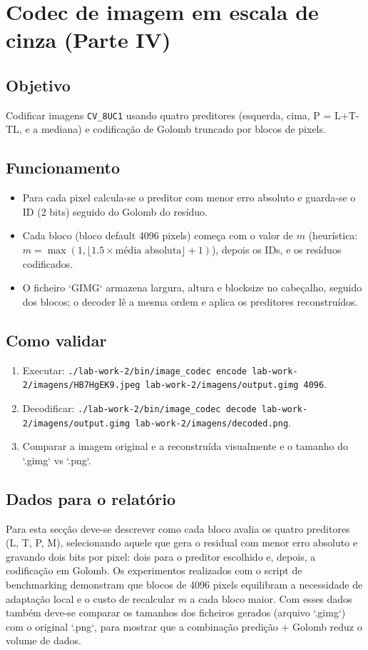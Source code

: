 \FloatBarrier

\section{Codec de imagem em escala de cinza (Parte IV)}
\subsection{Objetivo}
Codificar imagens \texttt{CV\_8UC1} usando quatro preditores (esquerda, cima, P = L+T-TL, e a mediana) e codificação de Golomb truncado por blocos de pixels.

\subsection{Funcionamento}
\begin{itemize}
  \item Para cada pixel calcula-se o preditor com menor erro absoluto e guarda-se o ID (2 bits) seguido do Golomb do resíduo.
  \item Cada bloco (bloco default 4096 pixels) começa com o valor de \(m\) (heurística: \(m = \max(1,\lfloor1.5 \times \text{média absoluta}\rfloor + 1)\)), depois os IDs, e os resíduos codificados.
  \item O ficheiro `GIMG` armazena largura, altura e blocksize no cabeçalho, seguido dos blocos; o decoder lê a mesma ordem e aplica os preditores reconstruídos.
\end{itemize}

\subsection{Como validar}
\begin{enumerate}
  \item Executar: \texttt{./lab-work-2/bin/image_codec encode lab-work-2/imagens/HB7HgEK9.jpeg lab-work-2/imagens/output.gimg 4096}.
  \item Decodificar: \texttt{./lab-work-2/bin/image_codec decode lab-work-2/imagens/output.gimg lab-work-2/imagens/decoded.png}.
  \item Comparar a imagem original e a reconstruída visualmente e o tamanho do `.gimg` vs `.png`.
\end{enumerate}

\subsection{Dados para o relatório}
Para esta secção deve-se descrever como cada bloco avalia os quatro preditores (L, T, P, M), selecionando aquele que gera o residual com menor erro absoluto e gravando dois bits por pixel: dois para o preditor escolhido e, depois, a codificação em Golomb. Os experimentos realizados com o script de benchmarking demonstram que blocos de 4096 pixels equilibram a necessidade de adaptação local e o custo de recalcular \(m\) a cada bloco maior. Com esses dados também deve-se comparar os tamanhos dos ficheiros gerados (arquivo `.gimg`) com o original `.png`, para mostrar que a combinação predição + Golomb reduz o volume de dados.

